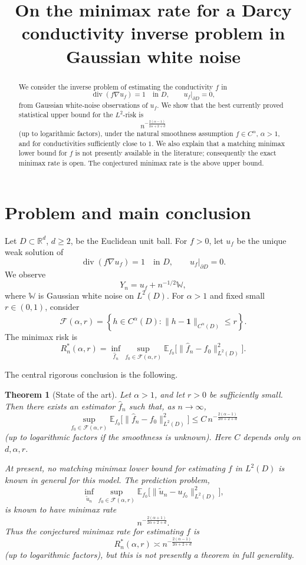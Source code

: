 \documentclass[11pt]{article}
\title{On the minimax rate for a Darcy conductivity inverse problem in Gaussian white noise}
\author{}
\date{}
\theoremstyle{plain}
\newtheorem{theorem}{Theorem}
\theoremstyle{definition}
\newcommand{\R}{\mathbb R}
\newcommand{\E}{\mathbb E}
\newcommand{\1}{\mathbf 1}
\newcommand{\F}{\mathcal F}
\DeclareMathOperator{\divg}{div}
\begin{document}
\maketitle

\begin{abstract}
We consider the inverse problem of estimating the conductivity \(f\) in
\[
\divg(f\nabla u_f)=1 \quad\text{in }D,\qquad u_f|_{\partial D}=0,
\]
from Gaussian white-noise observations of \(u_f\). We show that the best currently proved statistical upper bound for the \(L^2\)-risk is
\[
n^{-\frac{2(\alpha-1)}{2\alpha+2+d}}
\]
(up to logarithmic factors), under the natural smoothness assumption \(f\in C^\alpha\), \(\alpha>1\), and for conductivities sufficiently close to \(1\). We also explain that a matching minimax lower bound for \(f\) is not presently available in the literature; consequently the exact minimax rate is open. The conjectured minimax rate is the above upper bound.
\end{abstract}

\section{Problem and main conclusion}

Let \(D\subset \R^d\), \(d\ge 2\), be the Euclidean unit ball. For \(f>0\), let \(u_f\) be the unique weak solution of
\[
\divg(f\nabla u_f)=1 \quad\text{in }D,\qquad u_f|_{\partial D}=0.
\]
We observe
\[
Y_n = u_f + n^{-1/2}\mathbb W,
\]
where \(\mathbb W\) is Gaussian white noise on \(L^2(D)\). For \(\alpha>1\) and fixed small \(r\in(0,1)\), consider
\[
\F(\alpha,r)
=
\left\{
h\in C^\alpha(D): \|h-\1\|_{C^\alpha(D)}\le r
\right\}.
\]
The minimax risk is
\[
R_n^*(\alpha,r)
=
\inf_{\hat f_n}
\sup_{f_0\in \F(\alpha,r)}
\E_{f_0}\bigl[\|\hat f_n-f_0\|_{L^2(D)}^2\bigr].
\]

The central rigorous conclusion is the following.

\begin{theorem}[State of the art]
\label{thm:state}
Let \(\alpha>1\), and let \(r>0\) be sufficiently small. Then there exists an estimator \(\hat f_n\) such that, as \(n\to\infty\),
\[
\sup_{f_0\in\F(\alpha,r)}
\E_{f_0}\bigl[\|\hat f_n-f_0\|_{L^2(D)}^2\bigr]
\le
C\, n^{-\frac{2(\alpha-1)}{2\alpha+2+d}}
\]
(up to logarithmic factors if the smoothness is unknown). Here \(C\) depends only on \(d,\alpha,r\).

At present, no matching minimax lower bound for estimating \(f\) in \(L^2(D)\) is known in general for this model. The prediction problem,
\[
\inf_{\tilde u_n}
\sup_{f_0\in\F(\alpha,r)}
\E_{f_0}\bigl[\|\tilde u_n-u_{f_0}\|_{L^2(D)}^2\bigr],
\]
is known to have minimax rate
\[
n^{-\frac{2(\alpha+1)}{2\alpha+2+d}}.
\]
Thus the conjectured minimax rate for estimating \(f\) is
\[
R_n^*(\alpha,r)
\asymp
n^{-\frac{2(\alpha-1)}{2\alpha+2+d}}
\]
(up to logarithmic factors), but this is not presently a theorem in full generality.
\end{theorem}
\end{document}
